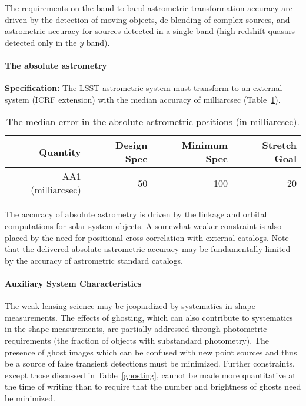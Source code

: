 The requirements on the band-to-band astrometric transformation accuracy
are driven by the detection of moving objects, de-blending of complex
sources, and astrometric accuracy for sources detected in a single-band
(\eg high-redshift quasars detected only in the $y$ band).


\paragraph{The absolute astrometry\\}

{\bf Specification:} The LSST astrometric system must transform to an
external system (\eg ICRF extension) with the median accuracy of
milliarcsec (Table~\ref{TastroAbs}).

\begin{table}[h]
\begin{tabular}{|r|r|r|r|}
\hline
Quantity            & Design Spec & Minimum Spec & Stretch Goal     \\
\hline
  AA1 (milliarcsec)  &    50      &      100    &       20         \\
\hline
\end{tabular}
\caption{The median error in the absolute astrometric positions (in
  milliarcsec).}
\label{TastroAbs}
\end{table}

The accuracy of absolute astrometry is driven by the linkage and orbital
computations for solar system objects. A somewhat weaker constraint is also
placed by the need for positional cross-correlation with external
catalogs. Note that the delivered absolute astrometric accuracy may be
fundamentally limited by the accuracy of astrometric standard catalogs.


\paragraph{Auxiliary System Characteristics\\}

The weak lensing science may be jeopardized by systematics in shape
measurements.
The effects of ghosting, which can also contribute to systematics in the
shape measurements, are partially addressed through photometric
requirements (\eg the fraction of objects with substandard photometry).
The presence of ghost images which can be confused with new point sources
and thus be a source of false transient detections must be minimized.
Further constraints, except those discussed in Table~\ref{ghosting},
cannot be made more quantitative at the time of writing than to
require that the number and brightness of ghosts need be minimized.

